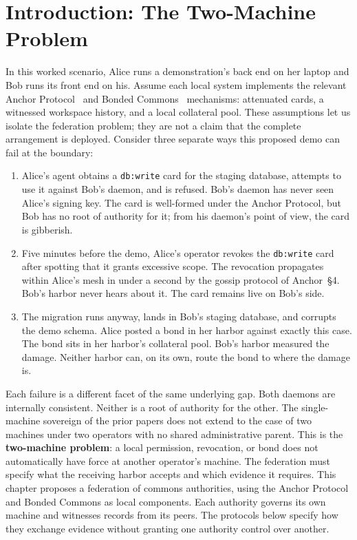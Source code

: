\documentclass[11pt,a4paper]{article}
\theoremstyle{definition}
\theoremstyle{remark}
\begin{document}
\section{Introduction: The Two-Machine Problem}\label{sec:fh-intro}
In this worked scenario, Alice runs a demonstration's back end on her
laptop and Bob runs its front end on his. Assume each local system implements
the relevant Anchor Protocol~ and Bonded
Commons~ mechanisms: attenuated cards, a witnessed
workspace history, and a local collateral pool. These assumptions let us
isolate the federation problem; they are not a claim that the complete
arrangement is deployed.
Consider three separate ways this proposed demo can fail at the boundary:
\begin{enumerate}
\item Alice's agent obtains a \texttt{db:write} card for the staging database, attempts to use it against Bob's daemon, and is refused. Bob's daemon has never seen Alice's signing key. The card is well-formed under the Anchor Protocol, but Bob has no root of authority for it; from his daemon's point of view, the card is gibberish.
\item Five minutes before the demo, Alice's operator revokes the \texttt{db:write} card after spotting that it grants excessive scope. The revocation propagates within Alice's mesh in under a second by the gossip protocol of Anchor~\S4. Bob's harbor never hears about it. The card remains live on Bob's side.
\item The migration runs anyway, lands in Bob's staging database, and corrupts the demo schema. Alice posted a bond in her harbor against exactly this case. The bond sits in her harbor's collateral pool. Bob's harbor measured the damage. Neither harbor can, on its own, route the bond to where the damage is.
\end{enumerate}
Each failure is a different facet of the same underlying gap. Both daemons are internally consistent. Neither is a root of authority for the other. The single-machine sovereign of the prior papers does not extend to the case of two machines under two operators with no shared administrative parent.
This is the \textbf{two-machine problem}: a local permission, revocation, or bond does not automatically have force at another operator's machine. The federation must specify what the receiving harbor accepts and which evidence it requires.
This chapter proposes a federation of commons authorities, using the
Anchor Protocol and Bonded Commons as local components. Each authority
governs its own machine and witnesses records from its peers. The protocols
below specify how they exchange evidence without granting one authority
control over another.
\end{document}
